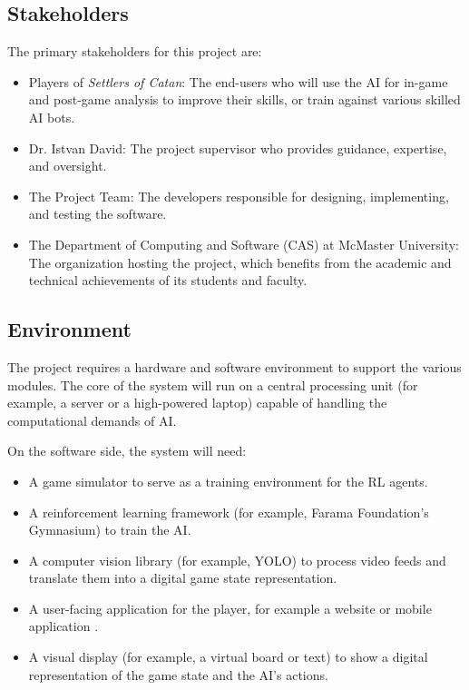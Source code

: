 \documentclass{article}
\begin{document}
\subsection{Stakeholders}\label{subsec:stakeholders}
The primary stakeholders for this project are:
\begin{itemize}
    \item Players of \emph{Settlers of Catan}: The end-users who will use the AI for in-game and post-game analysis to improve their skills, or train against various skilled AI bots.
    \item Dr. Istvan David: The project supervisor who provides guidance, expertise, and oversight.
    \item The Project Team: The developers responsible for designing, implementing, and testing the software.
    \item The Department of Computing and Software (CAS) at McMaster University: The organization hosting the project, which benefits from the academic and technical achievements of its students and faculty.
\end{itemize}

\subsection{Environment}\label{subsec:environment}
The project requires a hardware and software environment to support the various modules.
The core of the system will run on a central processing unit (for example, a server or a high-powered laptop) capable of handling the computational demands of AI\@.

On the software side, the system will need:
\begin{itemize}
    \item A game simulator to serve as a training environment for the RL agents.
    \item A reinforcement learning framework (for example, Farama Foundation's Gymnasium) to train the AI\@.
    \item A computer vision library (for example, YOLO) to process video feeds and translate them into a digital game state representation.
    \item A user-facing application for the player, for example a website or mobile application .
    \item A visual display (for example, a virtual board or text) to show a digital representation of the game state and the AI's actions.
\end{itemize}
\end{document}
